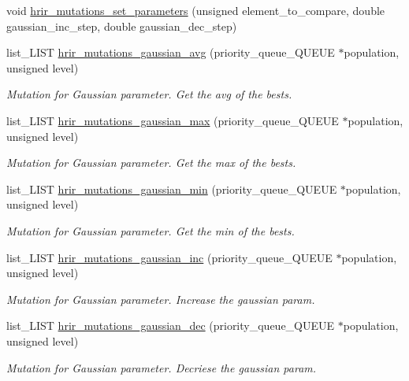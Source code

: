 \begin{DoxyCompactItemize}
\item 
void \hyperlink{a00005_ac26fc6e9ac49a6a0a69537b0b0d0ae82}{hrir\-\_\-mutations\-\_\-set\-\_\-parameters} (unsigned element\-\_\-to\-\_\-compare, double gaussian\-\_\-inc\-\_\-step, double gaussian\-\_\-dec\-\_\-step)
\item 
list\-\_\-\-L\-I\-S\-T \hyperlink{a00005_a0626d7e1b29015e79d2a1c53043a32ff}{hrir\-\_\-mutations\-\_\-gaussian\-\_\-avg} (priority\-\_\-queue\-\_\-\-Q\-U\-E\-U\-E $\ast$population, unsigned level)
\begin{DoxyCompactList}\small\item\em Mutation for Gaussian parameter. Get the avg of the bests. \end{DoxyCompactList}\item 
list\-\_\-\-L\-I\-S\-T \hyperlink{a00005_ab596bbc8fae02639cd5a46322015f66b}{hrir\-\_\-mutations\-\_\-gaussian\-\_\-max} (priority\-\_\-queue\-\_\-\-Q\-U\-E\-U\-E $\ast$population, unsigned level)
\begin{DoxyCompactList}\small\item\em Mutation for Gaussian parameter. Get the max of the bests. \end{DoxyCompactList}\item 
list\-\_\-\-L\-I\-S\-T \hyperlink{a00005_a1127830c419620d7078e6fdf910d48bb}{hrir\-\_\-mutations\-\_\-gaussian\-\_\-min} (priority\-\_\-queue\-\_\-\-Q\-U\-E\-U\-E $\ast$population, unsigned level)
\begin{DoxyCompactList}\small\item\em Mutation for Gaussian parameter. Get the min of the bests. \end{DoxyCompactList}\item 
list\-\_\-\-L\-I\-S\-T \hyperlink{a00005_a3310c1cb3a9094f50d1a0f5091cc8253}{hrir\-\_\-mutations\-\_\-gaussian\-\_\-inc} (priority\-\_\-queue\-\_\-\-Q\-U\-E\-U\-E $\ast$population, unsigned level)
\begin{DoxyCompactList}\small\item\em Mutation for Gaussian parameter. Increase the gaussian param. \end{DoxyCompactList}\item 
list\-\_\-\-L\-I\-S\-T \hyperlink{a00005_afccdc11049cb6ca8d828f0071716c878}{hrir\-\_\-mutations\-\_\-gaussian\-\_\-dec} (priority\-\_\-queue\-\_\-\-Q\-U\-E\-U\-E $\ast$population, unsigned level)
\begin{DoxyCompactList}\small\item\em Mutation for Gaussian parameter. Decriese the gaussian param. \end{DoxyCompactList}\item 

\end{DoxyCompactItemize}
